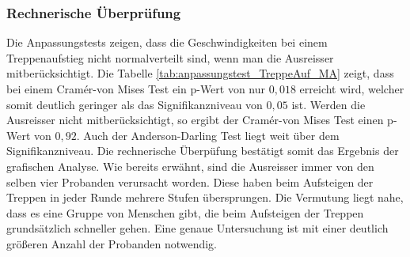 \subsubsection{Rechnerische Überprüfung}
Die Anpassungstests zeigen, dass die Geschwindigkeiten bei einem Treppenaufstieg nicht normalverteilt sind, wenn man die Ausreisser mitberücksichtigt. Die Tabelle \ref{tab:anpassungstest_TreppeAuf_MA} zeigt, dass bei einem Cram{\' e}r-von Mises Test ein p-Wert von nur $0,018$ erreicht wird, welcher somit deutlich geringer als das Signifikanzniveau von $0,05$ ist. Werden die Ausreisser nicht mitberücksichtigt, so ergibt der Cram{\' e}r-von Mises Test einen p-Wert von $0,92$. Auch der Anderson-Darling Test liegt weit über dem Signifikanzniveau. Die rechnerische Überpüfung bestätigt somit das Ergebnis der grafischen Analyse. Wie bereits erwähnt, sind die Ausreisser immer von den selben vier Probanden verursacht worden. Diese haben beim Aufsteigen der Treppen in jeder Runde mehrere Stufen übersprungen. Die Vermutung liegt nahe, dass es eine Gruppe von Menschen gibt, die beim Aufsteigen der Treppen grundsätzlich schneller gehen. Eine genaue Untersuchung ist mit einer deutlich größeren Anzahl der Probanden notwendig.
